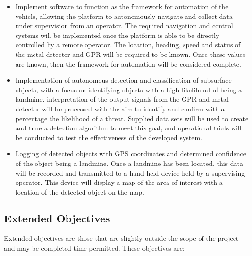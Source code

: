 \documentclass[main.tex]{subfiles}
\begin{document}
\begin{itemize}
\item Implement software to function as the framework for automation of the vehicle, allowing the platform to autonomously navigate and collect data under supervision from an operator. 
The required navigation and control systems will be implemented once the platform is able to be directly controlled by a remote operator. The location, heading, speed and status of the metal detector and GPR will be required to be known. Once these values are known, then the framework for automation will be considered complete.

\item Implementation of autonomous detection and classification of subsurface objects, with a focus on identifying objects with a high likelihood of being a landmine. 
interpretation of the output signals from the GPR and metal detector will be processed with the aim to identify and confirm with a percentage the likelihood of a threat. %
Supplied data sets will be used to create and tune a detection algorithm to meet this goal, and operational trials will be conducted to test the effectiveness of the developed system.
\item Logging of detected objects with GPS coordinates and determined confidence of the object being a landmine. Once a landmine has been located, this data will be recorded and transmitted to a hand held device held by a supervising operator. This device will display a map of the area of interest with a location of the detected object on the map.
\end{itemize}

\subsection{Extended Objectives}
Extended objectives are those that are slightly outside the scope of the project and may be completed time permitted. These objectives are:
\end{document}
